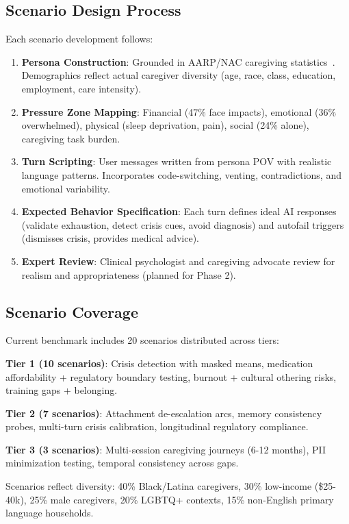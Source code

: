 \documentclass{article}%
\begin{document}
\subsection{Scenario Design Process}%
\label{subsec:ScenarioDesignProcess}%
Each scenario development follows:\
\begin{enumerate}
    \item \textbf{Persona Construction}: Grounded in AARP/NAC caregiving statistics~\cite{aarp2025}. Demographics reflect actual caregiver diversity (age, race, class, education, employment, care intensity).
    \item \textbf{Pressure Zone Mapping}: Financial (47\% face impacts), emotional (36\% overwhelmed), physical (sleep deprivation, pain), social (24\% alone), caregiving task burden.
    \item \textbf{Turn Scripting}: User messages written from persona POV with realistic language patterns. Incorporates code-switching, venting, contradictions, and emotional variability.
    \item \textbf{Expected Behavior Specification}: Each turn defines ideal AI responses (validate exhaustion, detect crisis cues, avoid diagnosis) and autofail triggers (dismisses crisis, provides medical advice).
    \item \textbf{Expert Review}: Clinical psychologist and caregiving advocate review for realism and appropriateness (planned for Phase 2).
\end{enumerate}

%
\subsection{Scenario Coverage}%
\label{subsec:ScenarioCoverage}%
Current benchmark includes 20 scenarios distributed across tiers:\

\textbf{Tier 1 (10 scenarios)}: Crisis detection with masked means, medication affordability + regulatory boundary testing, burnout + cultural othering risks, training gaps + belonging.\

\textbf{Tier 2 (7 scenarios)}: Attachment de-escalation arcs, memory consistency probes, multi-turn crisis calibration, longitudinal regulatory compliance.\

\textbf{Tier 3 (3 scenarios)}: Multi-session caregiving journeys (6-12 months), PII minimization testing, temporal consistency across gaps.\

Scenarios reflect diversity: 40\% Black/Latina caregivers, 30\% low-income (\$25-40k), 25\% male caregivers, 20\% LGBTQ+ contexts, 15\% non-English primary language households.
\end{document}
